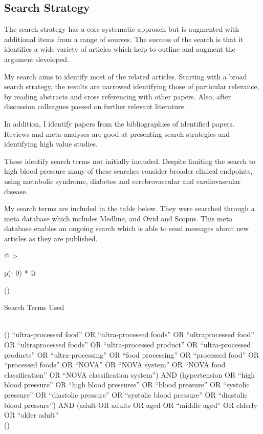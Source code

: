 \documentclass[
]{article}
\begin{document}
\hypertarget{search-strategy}{%
\subsection{Search Strategy}\label{search-strategy}}

The search strategy has a core systematic approach but is augmented with
additional items from a range of sources. The success of the search is
that it identifies a wide variety of articles which help to outline and
augment the argument developed.

My search aims to identify most of the related articles. Starting with a
broad search strategy, the results are narrowed identifying those of
particular relevance, by reading abstracts and cross referencing with
other papers. Also, after discussion colleagues passed on further
relevant literature.

In addition, I identify papers from the bibliographies of identified
papers. Reviews and meta-analyses are good at presenting search
strategies and identifying high value studies.

These identify search terms not initially included. Despite limiting the
search to high blood pressure many of these searches consider broader
clinical endpoints, using metabolic syndrome, diabetes and
cerebrovascular and cardiovascular disease.

My search terms are included in the table below. They were searched
through a meta database which includes Medline, and Ovid and Scopus.
This meta database enables an ongoing search which is able to send
messages about new articles as they are published.

\begin{longtable}[]{@{}
  >{\raggedright\arraybackslash}p{(\columnwidth - 0\tabcolsep) * }@{}}
\toprule()
\begin{minipage}[b]{\linewidth}\raggedright
Search Terms Used
\end{minipage} \\
\midrule()
\endhead
``ultra-processed food'' OR ``ultra-processed foods'' OR
``ultraprocessed food'' OR ``ultraprocessed foods'' OR ``ultra-processed
product'' OR ``ultra-processed products'' OR ``ultra-processing'' OR
``food processing'' OR ``processed food'' OR ``processed foods'' OR
``NOVA'' OR ``NOVA system'' OR ``NOVA food classification'' OR ``NOVA
classification system'') AND (hypertension OR ``high blood pressure'' OR
``high blood pressures'' OR ``blood pressure'' OR ``systolic pressure''
OR ``diastolic pressure'' OR ``systolic blood pressure'' OR ``diastolic
blood pressure'') AND (adult OR adults OR aged OR ``middle aged'' OR
elderly OR ``older adult'' \\
\bottomrule()
\end{longtable}
\end{document}
